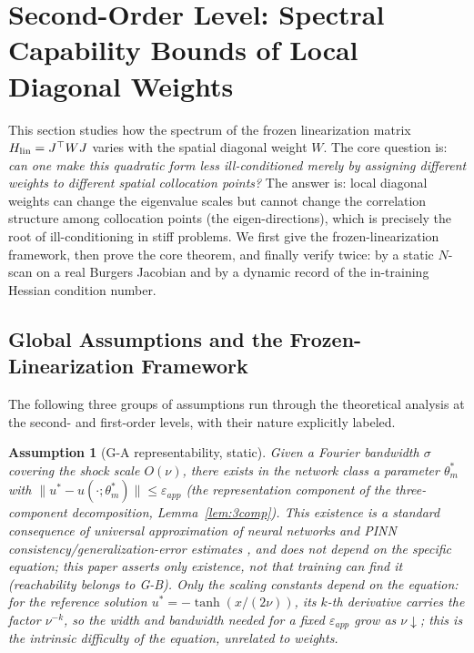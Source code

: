 \documentclass[11pt]{article}
\newcommand{\W}{W}
\newtheorem{assumption}{Assumption}[section]
\numberwithin{equation}{section}
\begin{document}
\FloatBarrier

\section{Second-Order Level: Spectral Capability Bounds of Local Diagonal Weights}\label{sec:R}

This section studies how the spectrum of the frozen linearization matrix $H_{\rm lin}=J^\top\W J$ varies with the spatial diagonal weight $\W$. The core question is: \emph{can one make this quadratic form less ill-conditioned merely by assigning different weights to different spatial collocation points?} The answer is: local diagonal weights can change the eigenvalue scales but cannot change the correlation structure among collocation points (the eigen-directions), which is precisely the root of ill-conditioning in stiff problems. We first give the frozen-linearization framework, then prove the core theorem, and finally verify twice: by a static $N$-scan on a real Burgers Jacobian and by a dynamic record of the in-training Hessian condition number.

\subsection{Global Assumptions and the Frozen-Linearization Framework}\label{sec:R-frame}

The following three groups of assumptions run through the theoretical analysis at the second- and first-order levels, with their nature explicitly labeled.

\begin{assumption}[G-A representability, static]\label{ass:GA}
Given a Fourier bandwidth $\sigma$ covering the shock scale $O(\nu)$, there \emph{exists} in the network class a parameter $\theta_m^*$ with $\|u^*-u(\cdot;\theta_m^*)\|\le\varepsilon_{app}$ (the representation component of the three-component decomposition, Lemma~\ref{lem:3comp}). This \emph{existence} is a standard consequence of universal approximation of neural networks and PINN consistency/generalization-error estimates \cite{Shin2020,MishraMolinaro2020,DeRyckMishra2024}, and \emph{does not depend on the specific equation}; this paper asserts only existence, not that training can find it (reachability belongs to G-B). \emph{Only the scaling constants depend on the equation}: for the reference solution $u^*=-\tanh(x/(2\nu))$, its $k$-th derivative carries the factor $\nu^{-k}$, so the width and bandwidth needed for a fixed $\varepsilon_{app}$ grow as $\nu\downarrow$; this is the intrinsic difficulty of the equation, unrelated to weights.
\end{assumption}
\end{document}
